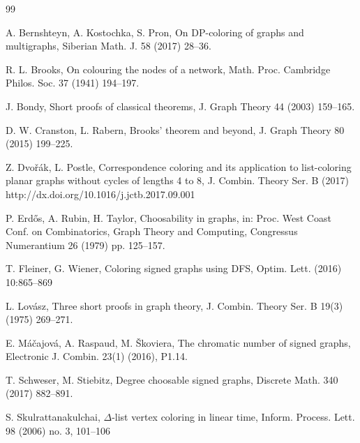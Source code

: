 \documentclass[12pt]{amsart}
\theoremstyle{plain}
\numberwithin{equation}{section}
\begin{document}
\begin{thebibliography}{99}

 A. Bernshteyn, A. Kostochka, S. Pron, On DP-coloring of graphs and multigraphs, Siberian Math. J. 58 (2017) 28--36.

 R. L. Brooks, On colouring the nodes of a network, Math. Proc. Cambridge Philos. Soc. 37 (1941) 194--197.

 J. Bondy, Short proofs of classical theorems, J. Graph Theory 44 (2003) 159--165.


 D. W. Cranston, L. Rabern, Brooks' theorem and beyond, J. Graph Theory 80 (2015) 199--225.

 Z. Dvo\v{r}\'{a}k, L. Postle, Correspondence coloring and its application to list-coloring planar graphs without cycles of lengths 4 to 8, J. Combin. Theory Ser. B (2017) 
http://dx.doi.org/10.1016/j.jctb.2017.09.001

 P. Erd\H{o}s, A. Rubin, H. Taylor, Choosability in graphs, in: Proc. West Coast Conf. on Combinatorics, Graph Theory and Computing, Congressus Numerantium 26 (1979) pp. 125{--}157.

 T. Fleiner, G. Wiener, Coloring signed graphs using DFS, Optim. Lett.  (2016) 10:865--869

 L. Lov\'{a}sz, Three short proofs in graph theory, J. Combin. Theory Ser. B 19(3) (1975) 269{--}271.

 E. M\'{a}\v{c}ajov\'{a}, A. Raspaud, M. \v{S}koviera, The chromatic number of signed graphs, Electronic J. Combin. 23(1) (2016), P1.14.

 T. Schweser, M. Stiebitz, Degree choosable signed graphs, Discrete Math. 340 (2017) 882--891.

S. Skulrattanakulchai, {$\Delta$}-list vertex coloring in linear time, Inform. Process. Lett. 98 (2006) no. 3, 101--106

\end{thebibliography}
\end{document}
